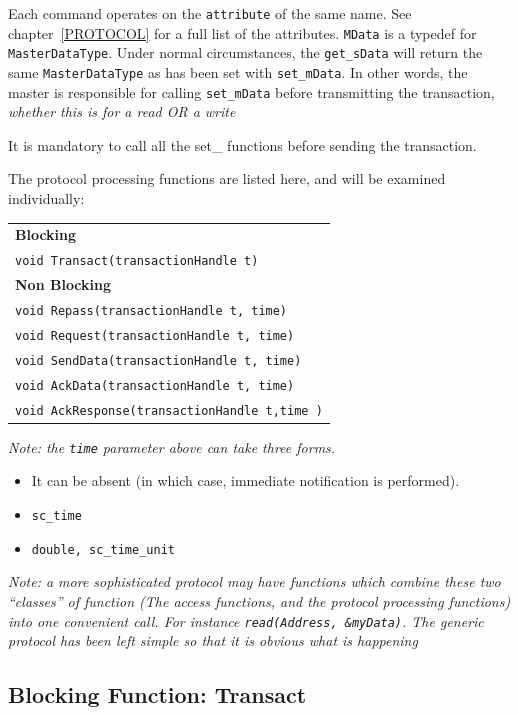 \documentclass[12pt,oneside]{gsbook}
\begin{document}
Each command operates on the {\tt attribute} of the same name. See
chapter~\ref{PROTOCOL} for a full list of the attributes.  {\tt MData}
is a typedef for {\tt MasterDataType}.  Under normal circumstances,
the {\tt get\_sData} will return the same {\tt MasterDataType} as has
been set with {\tt set\_mData}. In other words, the master is
responsible for calling {\tt set\_mData} before transmitting the
transaction, {\em whether this is for a read OR a write}

It is mandatory to call all the set\_ functions before sending the
transaction.


The protocol processing functions are listed here, and will be examined
individually:

\begin{tabular}{|l|}
\hline
{\bf Blocking}\\
    {\tt void Transact(transactionHandle t)}\\
\hline
{\bf Non Blocking}\\
    {\tt void Repass(transactionHandle t, time)}\\
    {\tt void Request(transactionHandle t, time)}\\
    {\tt void SendData(transactionHandle t, time)}\\
    {\tt void AckData(transactionHandle t, time)}\\
    {\tt void AckResponse(transactionHandle t,time )}\\
\hline
\end{tabular}

{\em Note: the {\tt time} parameter above can take three forms. 
\begin{itemize}
\item It can be absent (in which case, immediate notification is
performed).
\item {\tt sc\_time}
\item {\tt double, sc\_time\_unit}
\end{itemize}}

{\em Note: a more sophisticated protocol may have functions which
combine these two ``classes'' of function (The access functions, and the protocol
processing functions) into one convenient
call. For instance {\tt read(Address, \&myData)}. The generic protocol
has been left simple so that it is obvious what is happening }

\subsection{Blocking Function: Transact}
\end{document}
